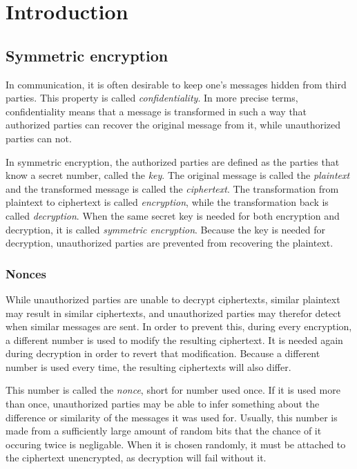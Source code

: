 \section{Introduction}

\subsection{Symmetric encryption}

In communication, it is often desirable to keep one's messages hidden from third
parties. This property is called \emph{confidentiality}. In more precise terms,
confidentiality means that a message is transformed in such a way that
authorized parties can recover the original message from it, while unauthorized
parties can not.

In symmetric encryption, the authorized parties are defined as
the parties that know a secret number, called the \emph{key}. The original
message is called the \emph{plaintext} and the transformed message is called the
\emph{ciphertext}. The transformation from plaintext to ciphertext is called
\emph{encryption}, while the transformation back is called \emph{decryption}.
When the same secret key is needed for both encryption and decryption, it is
called \emph{symmetric encryption}. Because the key is needed for decryption,
unauthorized parties are prevented from recovering the plaintext.

\subsubsection{Nonces}

While unauthorized parties are unable to decrypt ciphertexts, similar plaintext
may result in similar ciphertexts, and unauthorized parties may therefor detect
when similar messages are sent. In order to prevent this, during every
encryption, a different number is used to modify the resulting ciphertext. It is
needed again during decryption in order to revert that modification. Because a
different number is used every time, the resulting ciphertexts will also differ.

This number is called the \emph{nonce}, short for number used once. If it is
used more than once, unauthorized parties may be able to infer something about
the difference or similarity of the messages it was used for. Usually, this
number is made from a sufficiently large amount of random bits that the chance
of it occuring twice is negligable. When it is chosen randomly, it must be
attached to the ciphertext unencrypted, as decryption will fail without it.

